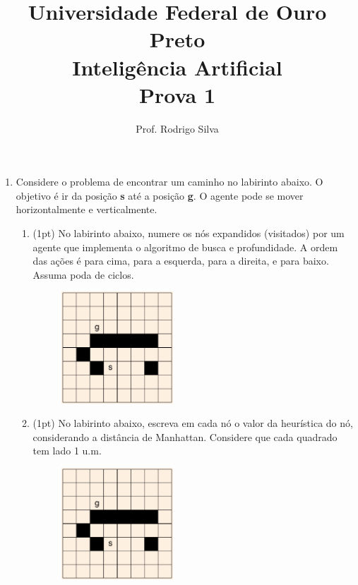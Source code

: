 \documentclass{article}
\title{\vspace{-2 cm}Universidade Federal de Ouro Preto \\ Inteligência Artificial \\ Prova 1}
\author{Prof. Rodrigo Silva}
\date{}
\begin{document}
\maketitle


\begin{enumerate}
    
    \item Considere o problema de encontrar um caminho no labirinto abaixo. O objetivo é ir da posição \textbf{s} até a posição \textbf{g}. O agente pode se mover horizontalmente e verticalmente. 
    
    \begin{enumerate}
        
        \item (1pt) No labirinto abaixo, numere os nós expandidos (visitados) por um agente que implementa o algoritmo de busca e profundidade. A ordem das ações é para cima, para a esquerda, para a direita, e para baixo. Assuma poda de ciclos.
        \begin{figure}[!ht]
            \centering
            \includegraphics[width=0.42\textwidth]{grid.png}
        \end{figure}
        
        \item (1pt) No labirinto abaixo, escreva em cada nó o valor da heurística do nó, considerando a distância de Manhattan. Considere que cada quadrado tem lado 1 u.m.
        \begin{figure}[!ht]
            \centering
            \includegraphics[width=0.42\textwidth]{grid.png}
        \end{figure}
        

\end{enumerate}
\end{enumerate}
\end{document}
